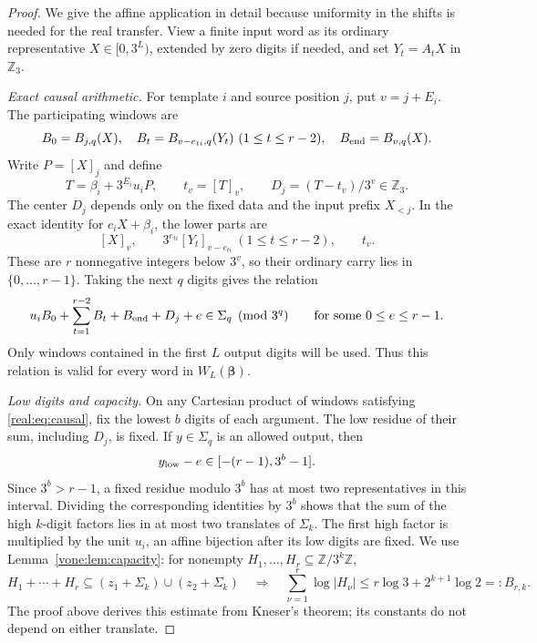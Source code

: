 \documentclass[11pt]{article}
\theoremstyle{definition}
\theoremstyle{remark}
\newcommand{\Z}{\mathbb Z}
\newcommand{\Sig}{\Sigma}
\begin{document}
\begin{proof}
We give the affine application in detail because uniformity in the
shifts is needed for the real transfer. View a finite input word as its
ordinary representative $X\in[0,3^L)$, extended by zero digits if needed,
and set $Y_t=A_tX$ in $\Z_3$.

\emph{Exact causal arithmetic.}
For template $i$ and source position $j$, put $v=j+E_i$. The participating
windows are
\[
 B_0=B_{j,q}(X),\quad
 B_t=B_{v-e_{ti},q}(Y_t)\ (1\le t\le r-2),\quad
 B_{\rm end}=B_{v,q}(X).
\]
Write $P=[X]_j$ and define
\[
 T=\beta_i+3^{E_i}u_iP,\qquad
 t_v=[T]_v,\qquad D_j=(T-t_v)/3^v\in\Z_3.
\]
The center $D_j$ depends only on the fixed data and the input prefix
$X_{<j}$. In the exact identity for $c_iX+\beta_i$, the lower parts are
\[
 [X]_v,\qquad 3^{e_{ti}}[Y_t]_{v-e_{ti}}\ (1\le t\le r-2),\qquad t_v.
\]
These are $r$ nonnegative integers below $3^v$, so their ordinary carry
lies in $\{0,\ldots,r-1\}$. Taking the next $q$ digits gives the relation
\begin{equation}\label{real:eq:causal}
 u_iB_0+\sum_{t=1}^{r-2}B_t+B_{\rm end}+D_j+e\in\Sig_q
       \pmod{3^q}\qquad\text{for some }0\le e\le r-1.
\end{equation}
Only windows contained in the first $L$ output digits will be used.
Thus this relation is valid for every word in $W_L(\boldsymbol\beta)$.

\emph{Low digits and capacity.}
On any Cartesian product of windows satisfying \eqref{real:eq:causal},
fix the lowest $b$ digits of each argument. The low residue of their
sum, including $D_j$, is fixed. If $y\in\Sig_q$ is an allowed output,
then
\[
                 y_{\rm low}-e\in[-(r-1),3^b-1].
\]
Since $3^b>r-1$, a fixed residue modulo $3^b$ has at most two
representatives in this interval. Dividing the corresponding identities
by $3^b$ shows that the sum of the high $k$-digit factors lies in at most
two translates of $\Sig_k$. The first high factor is multiplied by the
unit $u_i$, an affine bijection after its low digits are fixed.
We use Lemma~\ref{vone:lem:capacity}: for nonempty
$H_1,\ldots,H_r\subseteq\Z/3^k\Z$,
\begin{equation}\label{real:eq:capacity}
 H_1+\cdots+H_r\subseteq(z_1+\Sig_k)\cup(z_2+\Sig_k)
 \quad\Longrightarrow\quad
 \sum_{\nu=1}^r\log|H_\nu|\le r\log3+2^{k+1}\log2=:B_{r,k}.
\end{equation}
The proof above derives this estimate from Kneser's theorem;
its constants do not depend on either translate.


\end{proof}
\end{document}
